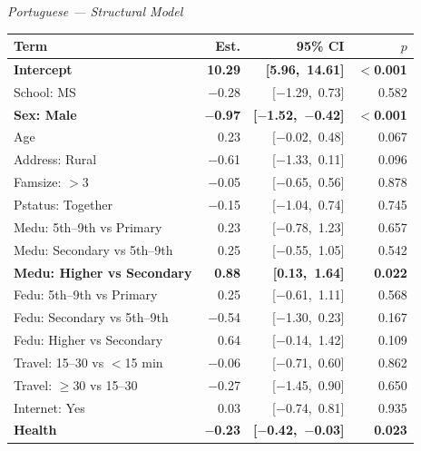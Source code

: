 \documentclass{article}
\begin{document}
\begin{minipage}[t]{0.49\textwidth}
\centering
\scriptsize
\textit{Portuguese --- Structural Model}\\[4pt]
\begin{tabularx}{\textwidth}{Xrrr}
\toprule
\textbf{Term} & \textbf{Est.} & \textbf{95\% CI} & \textbf{$p$} \\
\midrule
\textbf{Intercept}            & \textbf{10.29} & \textbf{[5.96,\ 14.61]} & \textbf{$<$0.001} \\
School: MS                    & $-$0.28 & [$-$1.29,\ 0.73] & 0.582 \\
\textbf{Sex: Male}            & \textbf{$-$0.97} & \textbf{[$-$1.52,\ $-$0.42]} & \textbf{$<$0.001} \\
Age                           &  0.23 & [$-$0.02,\ 0.48] & 0.067 \\
Address: Rural                & $-$0.61 & [$-$1.33,\ 0.11] & 0.096 \\
Famsize: $>$3                 & $-$0.05 & [$-$0.65,\ 0.56] & 0.878 \\
Pstatus: Together             & $-$0.15 & [$-$1.04,\ 0.74] & 0.745 \\
Medu: 5th--9th vs Primary     &  0.23 & [$-$0.78,\ 1.23] & 0.657 \\
Medu: Secondary vs 5th--9th   &  0.25 & [$-$0.55,\ 1.05] & 0.542 \\
\textbf{Medu: Higher vs Secondary} & \textbf{0.88} & \textbf{[0.13,\ 1.64]} & \textbf{0.022} \\
Fedu: 5th--9th vs Primary     &  0.25 & [$-$0.61,\ 1.11] & 0.568 \\
Fedu: Secondary vs 5th--9th   & $-$0.54 & [$-$1.30,\ 0.23] & 0.167 \\
Fedu: Higher vs Secondary     &  0.64 & [$-$0.14,\ 1.42] & 0.109 \\
Travel: 15--30 vs $<$15 min   & $-$0.06 & [$-$0.71,\ 0.60] & 0.862 \\
Travel: $\geq$30 vs 15--30    & $-$0.27 & [$-$1.45,\ 0.90] & 0.650 \\
Internet: Yes                 &  0.03 & [$-$0.74,\ 0.81] & 0.935 \\
\textbf{Health}               & \textbf{$-$0.23} & \textbf{[$-$0.42,\ $-$0.03]} & \textbf{0.023} \\
\bottomrule
\end{tabularx}
\end{minipage}
\end{document}
